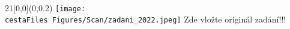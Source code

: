 ﻿\label{task}
﻿\begin{textblock}{21}[0,0](0,0.2) 
    \ifnum {}
        \texttt{[image: \\cestaFiles Figures/Scan/zadani\_2022.jpeg]}
    \else
        \vglue 13cm
        \hspace{5cm}
        {\huge Zde vložte originál zadání!!!}
    \fi
\end{textblock}


